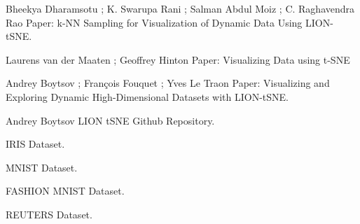 \documentclass{article}
\begin{document}
  


\clearpage
\renewcommand\refname{Źródła}
\begin{thebibliography}{1}

Bheekya Dharamsotu ; K. Swarupa Rani ; Salman Abdul Moiz ; C. Raghavendra Rao
\newblock Paper: k-NN Sampling for Visualization of Dynamic Data Using LION-tSNE. 

Laurens van der Maaten ; Geoffrey Hinton
\newblock Paper: Visualizing Data using t-SNE 


Andrey Boytsov ; François Fouquet ; Yves Le Traon
\newblock Paper: Visualizing and Exploring Dynamic High-Dimensional Datasets with LION-tSNE. 

Andrey Boytsov
\newblock LION tSNE Github Repository. 

\newblock IRIS Dataset. 

\newblock MNIST Dataset. 

\newblock FASHION MNIST Dataset. 

\newblock REUTERS Dataset. 

\end{thebibliography}
\end{document}
